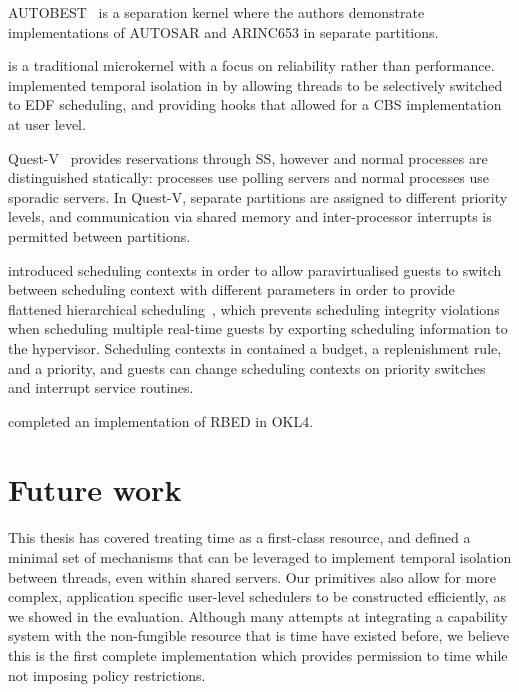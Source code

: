 AUTOBEST~\citep{Zuepke_BL_15} is a separation kernel where the authors demonstrate implementations
of AUTOSAR and ARINC653 in separate partitions.

\minix is a traditional microkernel with a focus on reliability rather than performance.
\citet{Herder_BGHT_06} implemented temporal isolation in \minix by allowing threads to be
selectively switched to \gls{EDF} scheduling, and providing hooks that allowed for a \gls{CBS}
implementation at user level. %

Quest-V~\citep{Danish_LW_11} provides reservations through \gls{SS}, however \IO and normal
processes are distinguished statically: \IO processes use polling servers and normal processes
use sporadic servers. In Quest-V, separate partitions are assigned to different priority levels,
and communication via shared memory and inter-processor interrupts is permitted between
partitions.

\fiascooc introduced scheduling contexts in order to allow paravirtualised guests to switch between
scheduling context with different parameters in order to provide flattened hierarchical
scheduling~\citep{Lackorzynski_WVH_12}, which prevents scheduling integrity violations when
scheduling multiple real-time guests by exporting scheduling information to the hypervisor.
Scheduling contexts in \fiascooc contained a budget, a replenishment rule, and a priority, and
guests can change scheduling contexts on priority switches and interrupt service routines.

\citet{Petters_LHE_98} completed an implementation of RBED in OKL4.

\section{Future work}

This thesis has covered treating time as a first-class resource, and defined a minimal set of
mechanisms that can be leveraged to implement temporal isolation between threads, even within shared
servers. Our primitives also allow for more complex, application specific user-level schedulers to
be constructed efficiently, as we showed in the evaluation. Although many attempts at integrating a
capability system with the non-fungible resource that is time have existed before, we believe this is
the first complete implementation which provides permission to time while not imposing policy
restrictions. 

